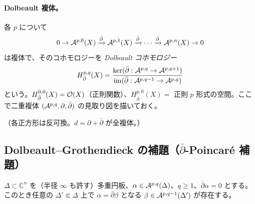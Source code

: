 \paragraph{Dolbeault 複体。}各 $p$ について
\[
0\to\mathcal A^{p,0}(X)\xrightarrow{\bar\partial}\mathcal A^{p,1}(X)\xrightarrow{\bar\partial}\cdots\xrightarrow{\bar\partial}\mathcal A^{p,n}(X)\to0
\]
は複体で、そのコホモロジーを \emph{Dolbeault コホモロジー}
\[
H^{p,q}_{\bar\partial}(X)=\frac{\ker(\bar\partial:\mathcal A^{p,q}\to\mathcal A^{p,q+1})}{\operatorname{im}(\bar\partial:\mathcal A^{p,q-1}\to\mathcal A^{p,q})}
\]
という。$H^{0,0}_{\bar\partial}(X)=\mathcal O(X)$（正則関数）、$H^{p,0}_{\bar\partial}(X)=$ 正則 $p$ 形式の空間。ここで二重複体 $(\mathcal A^{p,q},\partial,\bar\partial)$ の見取り図を描いておく。
\begin{center}
\end{center}
（各正方形は反可換。$d=\partial+\bar\partial$ が全複体。）

\subsection{Dolbeault--Grothendieck の補題（$\bar\partial$-Poincaré 補題）}
\begin{thm}\tC\label{thm:dolblemma}
$\Delta\subset\mathbb C^n$ を（半径 $\infty$ も許す）多重円板、$\alpha\in\mathcal A^{p,q}(\Delta)$、$q\ge1$、$\bar\partial\alpha=0$ とする。このとき任意の $\Delta'\Subset\Delta$ 上で $\alpha=\bar\partial\beta$ となる $\beta\in\mathcal A^{p,q-1}(\Delta')$ が存在する。
\end{thm}
